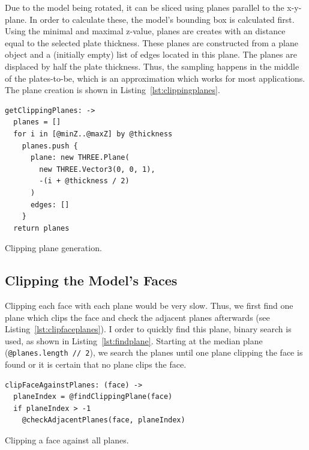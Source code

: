 \documentclass[../ClassicThesis.tex]{subfiles}
\begin{document}
Due to the model being rotated, it can be sliced using planes parallel to the x-y-plane. In order to calculate these, the model's bounding box is calculated first. Using the minimal and maximal z-value, planes are creates with an distance equal to the selected plate thickness. These planes are constructed from a \threejs plane object and a (initially empty) list of edges located in this plane. The planes are displaced by half the plate thickness. Thus, the sampling happens in the middle of the plates-to-be, which is an approximation which works for most applications. The plane creation is shown in Listing~\ref{lst:clippingplanes}.

\begin{listing}
\begin{verbatim}
getClippingPlanes: ->
  planes = []
  for i in [@minZ..@maxZ] by @thickness
    planes.push {
      plane: new THREE.Plane(
        new THREE.Vector3(0, 0, 1), 
        -(i + @thickness / 2)
      )
      edges: []
    }
  return planes
\end{verbatim}
\caption{Clipping plane generation.}
\label{lst:clippingplanes}
\end{listing}

\subsection{Clipping the Model's Faces}

Clipping each face with each plane would be very slow. Thus, we first find one plane which clips the face and check the adjacent planes afterwards (see Listing~\ref{lst:clipfaceplanes}). I order to quickly find this plane, binary search is used, as shown in Listing~\ref{lst:findplane}. Starting at the median plane (\texttt{@planes.length // 2}), we search the planes until one plane clipping the face is found or it is certain that no plane clips the face.

\begin{listing}
\begin{verbatim}
clipFaceAgainstPlanes: (face) ->
  planeIndex = @findClippingPlane(face)
  if planeIndex > -1
    @checkAdjacentPlanes(face, planeIndex)
\end{verbatim}
\caption{Clipping a face against all planes.}
\label{lst:clipfaceplanes}
\end{listing}
\end{document}

